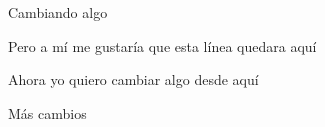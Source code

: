 \documentclass{article}
\begin{document}
Cambiando algo


Pero a mí me gustaría que esta línea quedara aquí

Ahora yo quiero cambiar algo desde aquí

Más cambios
\end{document}
